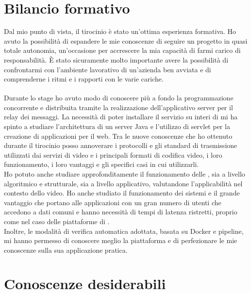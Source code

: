 \section{Bilancio formativo}
Dal mio punto di vista, il tirocinio è stato un'ottima esperienza formativa. Ho avuto la possibilità di espandere le mie conoscenze di seguire un progetto in quasi totale autonomia, un'occasione per accrescere la mia capacità di farmi carico di responsabilità. È stato sicuramente molto importante avere la possibilità di confrontarmi con l'ambiente lavorativo di un'azienda ben avviata e di comprenderne i ritmi e i rapporti con le varie cariche.
\paragraph*{}
Durante lo stage ho avuto modo di conoscere più a fondo la programmazione concorrente e distribuita tramite la realizzazione dell'applicativo server per il relay dei messaggi. La necessità di poter installare il servizio su interi  di  mi ha spinto a studiare l'architettura di un server Java e l'utilizzo di servlet per la creazione di applicazioni per il web. Tra le nuove conoscenze che ho ottenuto durante il tirocinio posso annoverare i protocolli e gli standard di trasmissione utilizzati dai servizi di  video e i principali formati di codifica video, i loro funzionamento, i loro vantaggi e gli specifici casi in cui utilizzarli.
\\
Ho potuto anche studiare approfonditamente il funzionamento delle , sia a livello algoritmico e strutturale, sia a livello applicativo, valutandone l'applicabilità nel contesto dello  video. Ho anche studiato il funzionamento dei sistemi  e il grande vantaggio che portano alle applicazioni con un gran numero di utenti che accedono a dati comuni e hanno necessità di tempi di latenza ristretti, proprio come nel caso delle piattaforme di . 
\\
Inoltre, le modalità di verifica automatica adottata, basata su Docker e pipeline, mi hanno permesso di conoscere meglio la piattaforma e di perfezionare le mie conoscenze sulla sua applicazione pratica.

\section{Conoscenze desiderabili}


